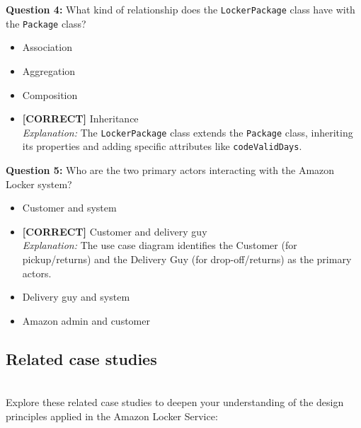 \vspace{0.3cm}
\noindent
\textbf{Question 4:} What kind of relationship does the \texttt{LockerPackage} class have with the \texttt{Package} class?
\\[0.2cm]
\begin{itemize}
 \item Association
 \item Aggregation
 \item Composition
 \item \textbf{[CORRECT]} Inheritance
\\[0.1cm]
\textit{Explanation:} 
The \texttt{LockerPackage} class extends the \texttt{Package} class, inheriting its properties and adding specific attributes like \texttt{codeValidDays}.
\end{itemize}
\vspace{0.3cm}
\noindent
\textbf{Question 5:} Who are the two primary actors interacting with the Amazon Locker system?
\\[0.2cm]
\begin{itemize}
 \item Customer and system
 \item \textbf{[CORRECT]} Customer and delivery guy
\\[0.1cm]
\textit{Explanation:} 
The use case diagram identifies the Customer (for pickup/returns) and the Delivery Guy (for drop-off/returns) as the primary actors.
 \item Delivery guy and system
 \item Amazon admin and customer
\end{itemize}

\subsection{Related case studies}\label{vVSv-bDSYp7VefvD9w_5b}
\\
Explore these related case studies to deepen your understanding of the design principles applied in the Amazon Locker Service:

